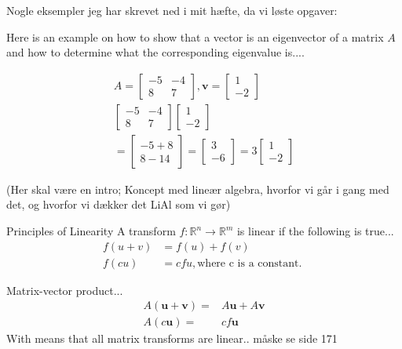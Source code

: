 Nogle eksempler jeg har skrevet ned i mit hæfte, da vi løste opgaver:

Here is an example on how to show that a vector is an eigenvector of a matrix $A$ and how to determine what the corresponding eigenvalue is.... 

\begin{align*}
A = \begin{bmatrix}-5 & -4 \\8 & 7 \end{bmatrix}, \textbf{v} =\begin{bmatrix}1 \\-2\end{bmatrix}\\
\begin{bmatrix}-5 & -4 \\8 & 7 \end{bmatrix} \begin{bmatrix}1 \\-2\end{bmatrix}\\ = \begin{bmatrix}-5 + 8 \\8  -14 \end{bmatrix} = \begin{bmatrix}3 \\-6 \end{bmatrix} = 3\begin{bmatrix}1\\-2 \end{bmatrix}
\end{align*}

(Her skal være en intro; Koncept med lineær algebra, hvorfor vi går i gang med det, og hvorfor vi dækker det LiAl som vi gør)

\begin{definition}{Principles of Linearity}
A transform $f: \mathbb{R}^n \rightarrow \mathbb{R}^m $ is linear if the following is true... 
\begin{align*}
f(u+v)&=f(u)+f(v)\\
f(c u)&=c f u ,  \text{where c is a constant. }
\end{align*}

Matrix-vector product...
\begin{align*}
A(\textbf{u}+\textbf{v})=& A\textbf{u}+A\textbf{v}\\
A(c \textbf{u})=& c f\textbf{u}
\end{align*}
With means that all matrix transforms are linear..
måske se side 171
\end{definition}

